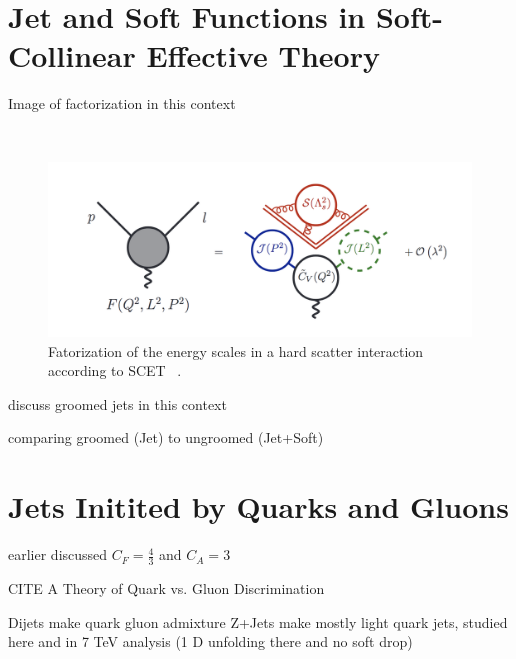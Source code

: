 

\section{Jet and Soft Functions in Soft-Collinear Effective Theory}

Image of factorization in this context

~\cite{Becher:2014oda}
\begin{figure}[htb]
\centering
\includegraphics[width=1.0\textwidth]{visuals/SCET-factorization.png}
\caption{Fatorization of the energy scales in a hard scatter interaction according to SCET ~\cite{Becher:2014oda}.}
\label{fig:scet}
\end{figure}
discuss groomed jets in this context

comparing groomed  (Jet) to ungroomed (Jet+Soft)

\section{Jets Initited by Quarks and Gluons }\label{jetgroom:ch1}



earlier discussed $C_F = \frac{4}{3}$ and $C_A=3$ 

CITE A Theory of Quark vs. Gluon Discrimination

Dijets make quark gluon admixture %
Z+Jets make mostly light quark jets, studied here and in 7 TeV analysis (1 D unfolding there and no soft drop)













